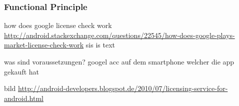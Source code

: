 \subsubsection{Functional Principle} \label{subsection:license-google-functional}
how does google license check work \url{http://android.stackexchange.com/questions/22545/how-does-google-plays-market-license-check-work}\newline
sis is text

was sind voraussetzungen? googel acc auf dem smartphone welcher die app gekauft hat\newline

bild \url{http://android-developers.blogspot.de/2010/07/licensing-service-for-android.html}
